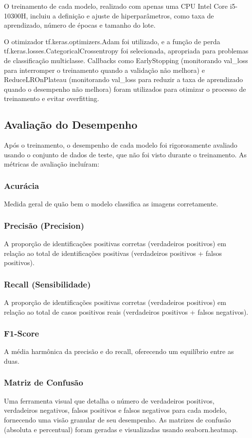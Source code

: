 \documentclass[10pt,conference]{IEEEtran}
\begin{document}
O treinamento de cada modelo, realizado com apenas uma CPU Intel Core i5-10300H, incluiu a definição e ajuste de hiperparâmetros, como taxa de aprendizado, número de épocas e tamanho do lote. 

O otimizador tf.keras.optimizers.Adam foi utilizado, e a função de perda tf.keras.losses.CategoricalCrossentropy foi selecionada, apropriada para problemas de classificação multiclasse. Callbacks como EarlyStopping (monitorando val\_loss para interromper o treinamento quando a validação não melhora) e ReduceLROnPlateau (monitorando val\_loss para reduzir a taxa de aprendizado quando o desempenho não melhora) foram utilizados para otimizar o processo de treinamento e evitar overfitting. 

\subsection{Avaliação do Desempenho}
Após o treinamento, o desempenho de cada modelo foi rigorosamente avaliado usando o conjunto de dados de teste, que não foi visto durante o treinamento. As métricas de avaliação incluíram: 
\subsubsection*{Acurácia}
Medida geral de quão bem o modelo classifica as imagens corretamente.
\subsubsection*{Precisão (Precision)}
A proporção de identificações positivas corretas (verdadeiros positivos) em relação ao total de identificações positivas (verdadeiros positivos + falsos positivos). 
\subsubsection*{Recall (Sensibilidade)}
A proporção de identificações positivas corretas (verdadeiros positivos) em relação ao total de casos positivos reais (verdadeiros positivos + falsos negativos). 
\subsubsection*{F1-Score}
A média harmônica da precisão e do recall, oferecendo um equilíbrio entre as duas. 
\subsubsection*{Matriz de Confusão}
    Uma ferramenta visual que detalha o número de verdadeiros positivos, verdadeiros negativos, falsos positivos e falsos negativos para cada modelo, fornecendo uma visão granular de seu desempenho. As matrizes de confusão (absoluta e percentual) foram geradas e visualizadas usando seaborn.heatmap. 
\end{document}

